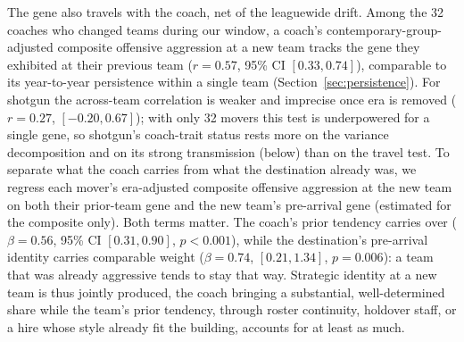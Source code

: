 \documentclass[USenglish]{article}
\theoremstyle{dgthm}
\theoremstyle{dgdef}
\begin{document}
The gene also travels with the coach, net of the leaguewide drift. Among the 32 coaches who changed teams during our window, a coach's contemporary-group-adjusted composite offensive aggression at a new team tracks the gene they exhibited at their previous team ($r=0.57$, 95\% CI $[0.33, 0.74]$), comparable to its year-to-year persistence within a single team (Section~\ref{sec:persistence}). For shotgun the across-team correlation is weaker and imprecise once era is removed ($r=0.27$, $[-0.20, 0.67]$); with only 32 movers this test is underpowered for a single gene, so shotgun's coach-trait status rests more on the variance decomposition and on its strong transmission (below) than on the travel test. To separate what the coach carries from what the destination already was, we regress each mover's era-adjusted composite offensive aggression at the new team on both their prior-team gene and the new team's pre-arrival gene (estimated for the composite only). Both terms matter. The coach's prior tendency carries over ($\beta=0.56$, 95\% CI $[0.31, 0.90]$, $p<0.001$), while the destination's pre-arrival identity carries comparable weight ($\beta=0.74$, $[0.21, 1.34]$, $p=0.006$): a team that was already aggressive tends to stay that way. Strategic identity at a new team is thus jointly produced, the coach bringing a substantial, well-determined share while the team's prior tendency, through roster continuity, holdover staff, or a hire whose style already fit the building, accounts for at least as much.
\end{document}
